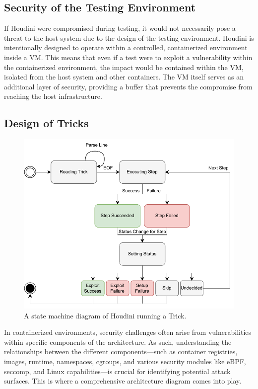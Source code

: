 \subsection{Security of the Testing Environment}

If Houdini were compromised during testing, it would not necessarily pose a threat to the host system due to the design of the testing environment. Houdini is intentionally designed to operate within a controlled, containerized environment inside a VM. This means that even if a test were to exploit a vulnerability within the containerized environment, the impact would be contained within the VM, isolated from the host system and other containers. The VM itself serves as an additional layer of security, providing a buffer that prevents the compromise from reaching the host infrastructure.

\subsection{Design of Tricks}

\begin{figure}
  \label{fig:state-machine}
  \includegraphics[width=1\linewidth]{figs/houdini-state-machine.pdf}
  \caption{A state machine diagram of Houdini running a Trick.}
\end{figure}

In containerized environments, security challenges often arise from vulnerabilities within specific components of the architecture. As such, understanding the relationships between the different components—such as container registries, images, runtime, namespaces, cgroups, and various security modules like eBPF, seccomp, and Linux capabilities—is crucial for identifying potential attack surfaces. This is where a comprehensive architecture diagram comes into play.

